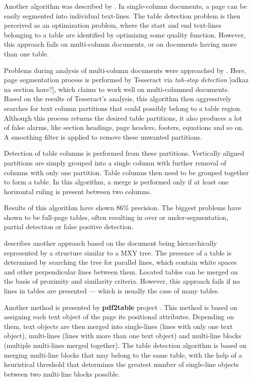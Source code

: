Another algorithm was described by \citet{MediumTable}. In single-column documents, a page can be easily segmented into individual text-lines. The table detection problem is then perceived as an optimization problem, where the start and end text-lines belonging to a table are identified by optimizing some quality function. However, this approach fails on multi-column documents, or on documents having more than one table.

Problems during analysis of multi-column documents were approached by \citet{tableDetHeterogeneous}. Here, page segmentation process is performed by Tesseract via \emph{tab-stop detection} [odkaz na section hore?], which claims to work well on multi-columned documents. Based on the results of Tesseract's analysis, this algorithm then aggressively searches for text column partitions that could possibly belong to a table region. Although this process returns the desired table partitions, it also produces a lot of false alarms, like section headings, page headers, footers, equations and so on. A smoothing filter is applied to remove these unwanted partitions.

Detection of table columns is performed from these partitions. Vertically aligned partitions are simply grouped into a single column with further removal of columns with only one partition. Table columns then need to be grouped together to form a table. In this algorithm, a merge is performed only if at least one horizontal ruling is present between two columns.

Results of this algorithm have shown 86\% precision. The biggest problems have shown to be full-page tables, often resulting in over or under-segmentation, partial detection or false positive detection. 

\citet{tableDetectCesarini} describes another approach based on the document being hierarchically represented by a structure similar to a MXY tree. The presence of a table is determined by searching the tree for parallel lines, which contain white spaces and other perpendicular lines between them. Located tables can be merged on the basis of proximity and similarity criteria. However, this approach fails if no lines in tables are presented --- which is usually the case of many tables.

Another method is presented by \textbf{pdf2table} project \cite{pdf2table}. This method is based on assigning each text object of the page its positional attributes. Depending on them, text objects are then merged into single-lines (lines with only one text object), multi-lines (lines with more than one text object) and multi-line blocks (multiple multi-lines merged together). The table detection algorithm is based on merging multi-line blocks that may belong to the same table, with the help of a heuristical threshold that determines the greatest number of single-line objects between two multi-line blocks possible.

